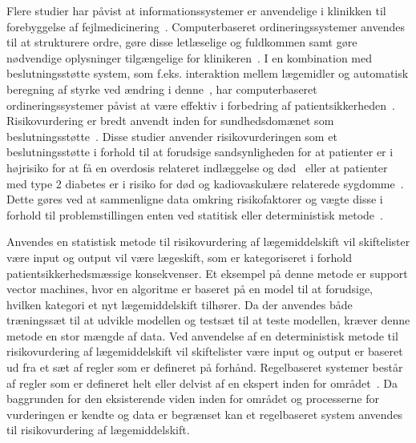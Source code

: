Flere studier har påvist at informationssystemer er anvendelige i klinikken til forebyggelse af fejlmedicinering~\citep{Agrawal2009, Kaushal2002, Stenner2010, Fischer2008, Simpson2008, Bates2000a}. Computerbaseret ordineringssystemer anvendes til at strukturere ordre, gøre disse letlæselige og fuldkommen samt gøre nødvendige oplysninger tilgængelige for klinikeren~\citep{Agrawal2009,Bates2000a}. I en kombination med beslutningsstøtte system, som f.eks. interaktion mellem lægemidler og automatisk beregning af styrke ved ændring i denne~\citep{Agrawal2009}, har computerbaseret ordineringssystemer påvist at være effektiv i forbedring af patientsikkerheden~\citep{Agrawal2009, Bates2000a}. Risikovurdering er bredt anvendt inden for sundhedsdomænet som beslutningsstøtte~\citep{Geissert2018, Rawshani2018}. Disse studier anvender risikovurderingen som et beslutningsstøtte i forhold til at forudsige sandsynligheden for at patienter er i højrisiko for at få en overdosis relateret indlæggelse og død~\citep{Geissert2018} eller at patienter med type 2 diabetes er i risiko for død og kadiovaskulære relaterede sygdomme~\citep{Rawshani2018}. Dette gøres ved at sammenligne data omkring risikofaktorer og vægte disse i forhold til problemstillingen enten ved statitisk eller deterministisk metode~\citep{Boyko1990}.

Anvendes en statistisk metode til risikovurdering af lægemiddelskift vil skiftelister være input og output vil være lægeskift, som er kategoriseret i forhold patientsikkerhedsmæssige konsekvenser. Et eksempel på denne metode er support vector machines, hvor en algoritme er baseret på en model til at forudsige, hvilken kategori et nyt lægemiddelskift tilhører. Da der anvendes både træningssæt til at udvikle modellen og testsæt til at teste modellen, kræver denne metode en stor mængde af data. Ved anvendelse af en deterministisk metode til risikovurdering af lægemiddelskift vil skiftelister være input og output er baseret ud fra et sæt af regler som er defineret på forhånd. Regelbaseret systemer består af regler som er defineret helt eller delvist af en ekspert inden for området~\citep{Crina2008}. Da baggrunden for den eksisterende viden inden for området og processerne for vurderingen er kendte og data er begrænset kan et regelbaseret system anvendes til risikovurdering af lægemiddelskift. 
 

